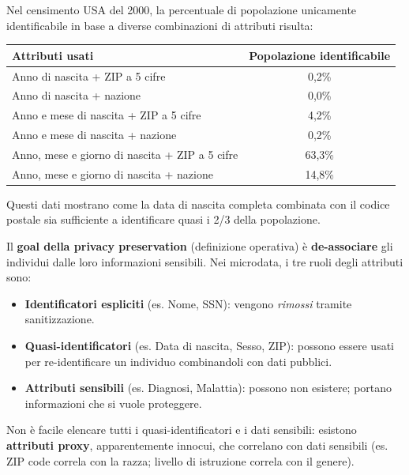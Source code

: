 \documentclass[a4paper,11pt]{article}
\begin{document}
\begin{esempio}
Nel censimento USA del 2000, la percentuale di popolazione unicamente identificabile in base a diverse combinazioni di attributi risulta:
\begin{center}
\begin{tabular}{lc}
\toprule
\textbf{Attributi usati} & \textbf{Popolazione identificabile} \\
\midrule
Anno di nascita + ZIP a 5 cifre & 0,2\% \\
Anno di nascita + nazione & 0,0\% \\
Anno e mese di nascita + ZIP a 5 cifre & 4,2\% \\
Anno e mese di nascita + nazione & 0,2\% \\
Anno, mese e giorno di nascita + ZIP a 5 cifre & 63,3\% \\
Anno, mese e giorno di nascita + nazione & 14,8\% \\
\bottomrule
\end{tabular}
\end{center}
Questi dati mostrano come la data di nascita completa combinata con il codice postale sia sufficiente a identificare quasi i 2/3 della popolazione.
\end{esempio}

\begin{nota}
Il \textbf{goal della privacy preservation} (definizione operativa) \`{e} \textbf{de-associare} gli individui dalle loro informazioni sensibili. Nei microdata, i tre ruoli degli attributi sono:
\begin{itemize}
  \item \textbf{Identificatori espliciti} (es. Nome, SSN): vengono \emph{rimossi} tramite sanitizzazione.
  \item \textbf{Quasi-identificatori} (es. Data di nascita, Sesso, ZIP): possono essere usati per re-identificare un individuo combinandoli con dati pubblici.
  \item \textbf{Attributi sensibili} (es. Diagnosi, Malattia): possono non esistere; portano informazioni che si vuole proteggere.
\end{itemize}
Non \`{e} facile elencare tutti i quasi-identificatori e i dati sensibili: esistono \textbf{attributi proxy}, apparentemente innocui, che correlano con dati sensibili (es. ZIP code correla con la razza; livello di istruzione correla con il genere).
\end{nota}
\end{document}
